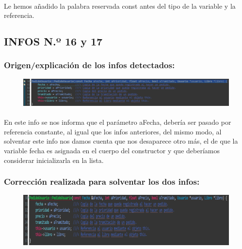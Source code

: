 			\paragraph{}Le hemos añadido la palabra reservada const antes del tipo de la variable y la referencia.
			
	\subsection{INFOS N.º 16 y 17}
	
		\subsubsection{Origen/explicación de los infos detectados:}
		
			\begin{figure}[H]
				\centering
				\includegraphics[scale=0.55]{img/esteban24.png}
				\label{esteban24}
			\end{figure}
		
			\paragraph{}En este info se nos informa que el parámetro aFecha, debería ser pasado por referencia constante, al igual que los infos anteriores, del mismo modo, al solventar este info nos damos cuenta que nos desaparece otro más, el de que la variable fecha es asignada en el cuerpo del constructor y que deberíamos considerar inicializarla en la lista.
			
		\subsubsection{Corrección realizada para solventar los dos infos:}
		
			\begin{figure}[H]
				\centering
				\includegraphics[scale=0.55]{img/esteban25.png}
				\label{esteban25}
			\end{figure}
		
